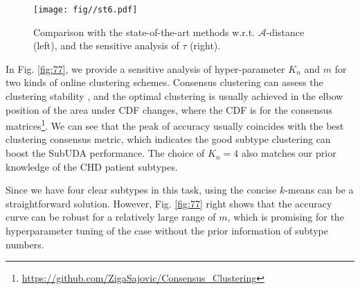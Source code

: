 \begin{figure}[t]
\centering
\texttt{[image: fig//st6.pdf]}\\ 
\caption{Comparison with the state-of-the-art methods w.r.t. $\mathcal{A}$-distance (left), and the sensitive analysis of $\tau$ (right).}\label{fig:66} 
\end{figure}





 







 
In Fig. \ref{fig:77}, we provide a sensitive analysis of hyper-parameter $K_n$ and $m$ for two kinds of online clustering schemes. Consensus clustering can assess the clustering stability \cite{monti2003consensus}, and the optimal clustering is usually achieved in the elbow position of the area under CDF changes, where the CDF is for the consensus matrices\footnote{\url{https://github.com/ZigaSajovic/Consensus_Clustering}}. We can see that the peak of accuracy usually coincides with the best clustering consensus metric, which indicates the good subtype clustering can boost the SubUDA performance. The choice of $K_n=4$ also matches our prior knowledge of the CHD patient subtypes. 
 

Since we have four clear subtypes in this task, using the concise $k$-means can be a straightforward solution. However, Fig. \ref{fig:77} right shows that the accuracy curve can be robust for a relatively large range of $m$, which is promising for the hyperparameter tuning of the case without the prior information of subtype numbers.




 








